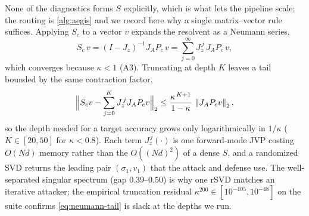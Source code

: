 None of the diagnostics forms $S$ explicitly, which is what lets the pipeline scale; the routing is
\cref{alg:aegis} and we record here why a single matrix--vector rule suffices. Applying $S_c$ to a
vector $v$ expands the resolvent as a Neumann series,
\begin{equation}
S_c\,v=(I-J_z)^{-1}J_A P_c\,v=\sum_{j=0}^{\infty}J_z^{\,j}\,J_A P_c\,v,
\label{eq:neumann}
\end{equation}
which converges because $\kappa<1$ (A3). Truncating at depth $K$ leaves a tail bounded by the same
contraction factor,
\begin{equation}
\Big\lVert S_c v-\sum_{j=0}^{K}J_z^{\,j}J_A P_c v\Big\rVert_2
\le\frac{\kappa^{\,K+1}}{1-\kappa}\,\left\|J_A P_c v\right\|_2,
\label{eq:neumann-tail}
\end{equation}
so the depth needed for a target accuracy grows only logarithmically in $1/\kappa$ ($K\in[20,50]$ for
$\kappa<0.8$). Each term $J_z^{\,j}(\cdot)$ is one forward-mode JVP costing $O(Nd)$ memory rather than
the $O((Nd)^2)$ of a dense $S$, and a randomized SVD returns the leading pair $(\sigma_1,v_1)$ that the
attack and defense use. The well-separated singular spectrum (gap $0.39$--$0.50$) is why one rSVD
matches an iterative attacker; the empirical truncation residual $\kappa^{200}\in[10^{-105},10^{-48}]$
on the suite confirms \eqref{eq:neumann-tail} is slack at the depths we run.
